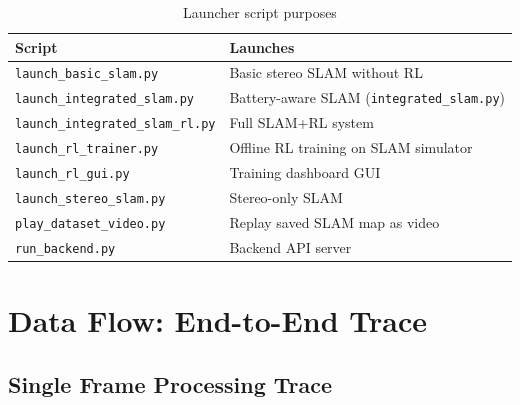 \documentclass[12pt,a4paper,twoside]{report}
\theoremstyle{definition}
\newcommand{\file}[1]{\texttt{\textcolor{codeblue}{#1}}}
\begin{document}
\begin{table}[H]
\centering
\caption{Launcher script purposes}\label{tab:launchers}
\begin{tabular}{lp{9cm}}
\toprule
\textbf{Script} & \textbf{Launches} \\
\midrule
\file{launch\_basic\_slam.py} & Basic stereo SLAM without RL \\
\file{launch\_integrated\_slam.py} & Battery-aware SLAM (\file{integrated\_slam.py}) \\
\file{launch\_integrated\_slam\_rl.py} & Full SLAM+RL system \\
\file{launch\_rl\_trainer.py} & Offline RL training on SLAM simulator \\
\file{launch\_rl\_gui.py} & Training dashboard GUI \\
\file{launch\_stereo\_slam.py} & Stereo-only SLAM \\
\file{play\_dataset\_video.py} & Replay saved SLAM map as video \\
\file{run\_backend.py} & Backend API server \\
\bottomrule
\end{tabular}
\end{table}

\chapter{Data Flow: End-to-End Trace}

\section{Single Frame Processing Trace}
\end{document}
